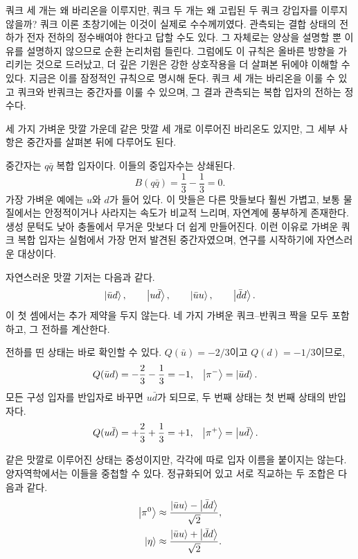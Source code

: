 쿼크 세 개는 왜 바리온을 이루지만, 쿼크 두 개는 왜 고립된 두 쿼크 강입자를 이루지 않을까? 쿼크 이론 초창기에는 이것이 실제로 수수께끼였다. 관측되는 결합 상태의 전하가 전자 전하의 정수배여야 한다고 답할 수도 있다. 그 자체로는 양상을 설명할 뿐 이유를 설명하지 않으므로 순환 논리처럼 들린다. 그럼에도 이 규칙은 올바른 방향을 가리키는 것으로 드러났고, 더 깊은 기원은 강한 상호작용을 더 살펴본 뒤에야 이해할 수 있다. 지금은 이를 잠정적인 규칙으로 명시해 둔다. 쿼크 세 개는 바리온을 이룰 수 있고 쿼크와 반쿼크는 중간자를 이룰 수 있으며, 그 결과 관측되는 복합 입자의 전하는 정수다.

세 가지 가벼운 맛깔 가운데 같은 맛깔 세 개로 이루어진 바리온도 있지만, 그 세부 사항은 중간자를 살펴본 뒤에 다루어도 된다.

중간자는 \(q\bar q\) 복합 입자이다. 이들의 중입자수는 상쇄된다.
\begin{equation}
B(q\bar q)=\frac13-\frac13=0.
\end{equation}
가장 가벼운 예에는 \(u\)와 \(d\)가 들어 있다. 이 맛들은 다른 맛들보다 훨씬 가볍고, 보통 물질에서는 안정적이거나 사라지는 속도가 비교적 느리며, 자연계에 풍부하게 존재한다. 생성 문턱도 낮아 충돌에서 무거운 맛보다 더 쉽게 만들어진다. 이런 이유로 가벼운 쿼크 복합 입자는 실험에서 가장 먼저 발견된 중간자였으며, 연구를 시작하기에 자연스러운 대상이다.

자연스러운 맛깔 기저는 다음과 같다.
\begin{equation}
\left\lvert\bar u d\right\rangle,\qquad \left\lvert u\bar d\right\rangle,\qquad \left\lvert\bar u u\right\rangle,\qquad \left\lvert\bar d d\right\rangle.
\end{equation}
이 첫 셈에서는 추가 제약을 두지 않는다. 네 가지 가벼운 쿼크--반쿼크 짝을 모두 포함하고, 그 전하를 계산한다.

전하를 띤 상태는 바로 확인할 수 있다. \(Q(\bar u)=-2/3\)이고 \(Q(d)=-1/3\)이므로,
\begin{align}
Q(\bar u d)&=-\frac23-\frac13=-1,
&
\left\lvert\pi^-\right\rangle&=\left\lvert\bar u d\right\rangle.
\end{align}
모든 구성 입자를 반입자로 바꾸면 \(u\bar d\)가 되므로, 두 번째 상태는 첫 번째 상태의 반입자다.
\begin{align}
Q(u\bar d)&=+\frac23+\frac13=+1,
&
\left\lvert\pi^+\right\rangle&=\left\lvert u\bar d\right\rangle.
\end{align}

같은 맛깔로 이루어진 상태는 중성이지만, 각각에 따로 입자 이름을 붙이지는 않는다. 양자역학에서는 이들을 중첩할 수 있다. 정규화되어 있고 서로 직교하는 두 조합은 다음과 같다.
\begin{align}
\left\lvert\pi^0\right\rangle &\approx \frac{\left\lvert\bar u u\right\rangle-\left\lvert\bar d d\right\rangle}{\sqrt2},\\
\left\lvert\eta\right\rangle &\approx \frac{\left\lvert\bar u u\right\rangle+\left\lvert\bar d d\right\rangle}{\sqrt2}.
\end{align}


